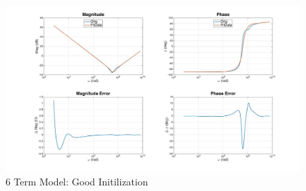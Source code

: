 \begin{figure}[ht!]
\ifisPPT
\noindent{}
\else
\includegraphics[keepaspectratio=true,width=6in]{./figures/regression/fullModel_GoodOutput.jpg}
\fi
\centering
\caption{6 Term Model: Good Initilization}
\label{fig:fullModel_GoodOutput}
\end{figure}
